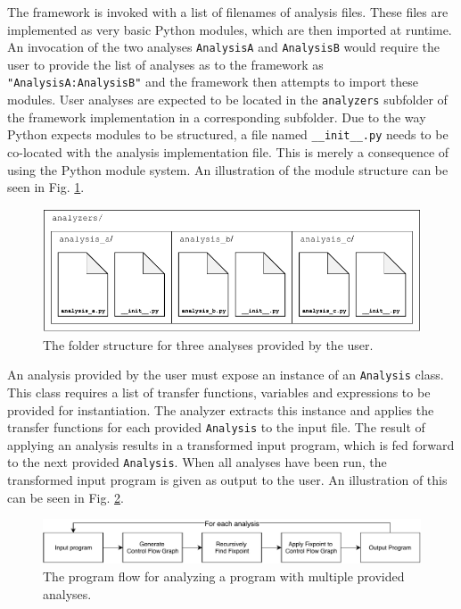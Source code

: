 \newpar The framework is invoked with a list of filenames of analysis files. These files are implemented as very basic Python modules, which are then imported at runtime. An invocation of the two analyses \texttt{AnalysisA} and \texttt{AnalysisB} would require the user to provide the list of analyses as to the framework as \texttt{"AnalysisA:AnalysisB"} and the framework then attempts to import these modules. 
User analyses are expected to be located in the \texttt{analyzers} subfolder of the framework implementation in a corresponding subfolder. Due to the way Python expects modules to be structured, a file named \texttt{\_\_init\_\_.py} needs to be co-located with the analysis implementation file. This is merely a consequence of using the Python module system. An illustration of the module structure can be seen in Fig. \ref{fig:modulestructure}.

\begin{figure}[H]
    \centering
    \includegraphics{implementation/figures/folderstructure}
    \caption{The folder structure for three analyses provided by the user.}
    \label{fig:modulestructure}
\end{figure}

\newpar An analysis provided by the user must expose an instance of an \texttt{Analysis} class. This class requires a list of transfer functions, variables and expressions to be provided for instantiation. The analyzer extracts this instance and applies the transfer functions for each provided \texttt{Analysis} to the input file. The result of applying an analysis results in a transformed input program, which is fed forward to the next provided \texttt{Analysis}. When all analyses have been run, the transformed input program is given as output to the user. An illustration of this can be seen in Fig. \ref{fig:programflow}.

\begin{figure}[H]
    \centering
    \includegraphics[width=\textwidth]{implementation/figures/programflow}
    \caption{The program flow for analyzing a program with multiple provided analyses.}
    \label{fig:programflow}
\end{figure}

